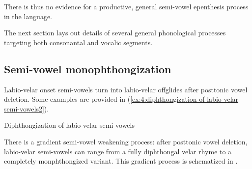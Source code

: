 \z

There is thus no evidence for a productive, general semi-vowel epenthesis process in the language.

The next section lays out details of several general phonological processes targeting both consonantal and vocalic segments.

\subsection{Semi-vowel monophthongization}
\label{subsec: semi-vowel monophthongization}

Labio-velar onset semi-vowels turn into labio-velar offglides after posttonic vowel deletion. Some examples are provided in (\ref{ex:4:diphthongization of labio-velar semi-vowels2}).

\ea\label{ex:4:diphthongization of labio-velar semi-vowels2}
{Diphthongization of labio-velar semi-vowels}

    \z
\z

There is a gradient semi-vowel weakening process: after posttonic vowel deletion, labio-velar semi-vowels can range from a fully diphthongal velar rhyme to a completely monphthongized variant. This gradient process is schematized in .


